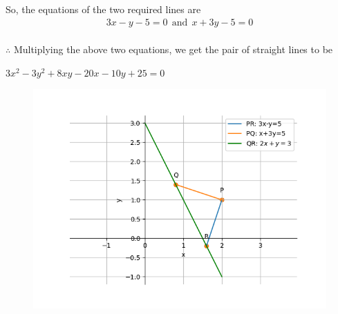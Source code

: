 \documentclass[journal]{IEEEtran}
\begin{document}
So, the equations of the two required lines are
\begin{align}
    3x-y-5=0 \ \ \text{and}\ \ x+3y-5=0
\end{align}\\

$\therefore$ Multiplying the above two equations, we get the pair of straight lines to be 
\begin{center}
   $3x^2 - 3y^2 + 8xy - 20x - 10y + 25 = 0$
\end{center} 

\begin{figure}[H]
    \centering
    \includegraphics[width=1\linewidth]{Figs/plot(py).png}
\end{figure}
\end{document}

